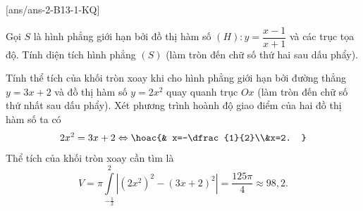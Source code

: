 [ans/ans-2-B13-1-KQ]
\caukq
\begin{ex}%
	Gọi $S$ là hình phẳng giới hạn bởi đồ thị hàm số $(H)\colon y=\dfrac{x-1}{x+1}$ và các trục tọa độ. Tính diện tích hình phẳng $(S)$ (làm tròn đến chữ số thứ hai sau dấu phẩy).
\end{ex}
\begin{ex}%
	Tính thể tích của khối tròn xoay khi cho hình phẳng giới hạn bởi đường thẳng $y=3x+2$ và đồ thị hàm số $y=2x^2$ quay quanh trục $Ox$ (làm tròn đến chữ số thứ nhất sau dấu phẩy).
	\loigiai
	{
	Xét phương trình hoành độ giao điểm của hai đồ thị hàm số ta có \[2x^2=3x+2\Leftrightarrow\hoac{& x=-\dfrac{1}{2}\\&x=2. }\]
	Thể tích của khối tròn xoay cần tìm là
	\[V=\pi\displaystyle\int\limits_{-\tfrac{1}{2}}^{2}\left |\left (2x^2 \right )^2-(3x+2)^2 \right |=\dfrac{125\pi}{4}\approx98{,}2.\]
	}
\end{ex}
